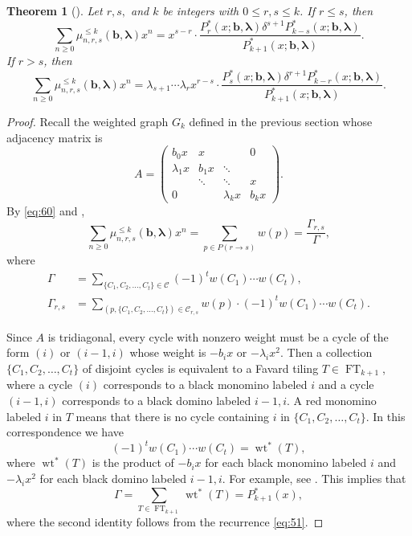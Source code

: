 \documentclass[oneside]{book}
\numberwithin{equation}{section}
\newtheorem{thm}{Theorem}[section]
\theoremstyle{definition}
\newcommand\FT{\operatorname{FT}}
\newcommand\wt{\operatorname{wt}}
\renewcommand\vec[1]{\bm{#1}}
\newcommand\vb{\vec{b}}
\newcommand\vla{\vec{\lambda}}
\begin{document}
\begin{thm}[]
Let \( r,s, \) and \( k \) be integers with \( 0\le r,s\le k \).
If \(r\le s\), then 
\[
  \sum_{n\ge0} \mu_{n,r,s}^{\le k}(\vb,\vla) x^n = x^{s-r} \cdot
  \frac{P^*_r(x;\vb,\vla) \delta^{s+1}
    P^*_{k-s}(x;\vb,\vla)}{P^*_{k+1}(x;\vb,\vla)}.
\]
  If \(r> s\), then
  \[
    \sum_{n\ge0} \mu_{n,r,s}^{\le k}(\vb,\vla) x^n = \lambda_{s+1}
    \cdots \lambda_r x^{r-s} \cdot \frac{ P^*_s(x;\vb,\vla) \delta^{r+1}
      P^*_{k-r}(x;\vb,\vla)}{P^*_{k+1}(x;\vb,\vla)} .
  \]
\end{thm}

\begin{proof}
Recall the
weighted graph \( G_k \) defined in the previous section whose
adjacency matrix is
 \[
  A = 
  \begin{pmatrix}
    b_0x & x &  & 0 \\
    \lambda_1x & b_1x & \ddots & \\
             & \ddots & \ddots & x \\
   0  &  & \lambda_{k}x & b_{k}x
  \end{pmatrix}.
\] 
By \eqref{eq:60} and ,
\begin{equation}\label{eq:64}
  \sum_{n\ge0} \mu_{n,r,s}^{\le k}(\vb,\vla) x^n
  = \sum_{p\in P(r\to s)}  w(p) =\frac{\Gamma_{r,s}}{\Gamma},
\end{equation}
where
\begin{align*}
  \Gamma
  &= \sum_{\{C_1, C_2,\dots,C_t\}\in \mathcal{C}} (-1)^{t} w(C_1) \cdots w(C_t),\\
  \Gamma_{r,s} &= \sum_{(p,\{C_1, C_2,\dots,C_t\})\in \mathcal{C}_{r,s}} w(p) \cdot (-1)^{t} w(C_1) \cdots w(C_t).
\end{align*}

Since \( A \) is tridiagonal, every cycle with nonzero weight must be
a cycle of the form \( (i) \) or \( (i-1,i) \) whose weight is
\( -b_ix \) or \( -\lambda_ix^2 \). Then a collection
\( \{C_1, C_2,\dots,C_t\} \) of disjoint cycles is equivalent to a
Favard tiling \( T\in \FT_{k+1} \), where a cycle \( (i) \)
corresponds to a black monomino labeled \( i \) and a cycle
\( (i-1,i) \) corresponds to a black domino labeled \( i-1,i \). A red
monomino labeled \( i \) in \( T \) means that there is no cycle
containing \( i \) in \( \{C_1, C_2,\dots,C_t\} \). In this
correspondence we have
\[
  (-1)^{t} w(C_1) \cdots w(C_t) = \wt^*(T),
\]
where \( \wt^*(T) \) is the product of \( -b_ix \) for each black
monomino labeled \( i \) and \( -\lambda_ix^2 \) for each black domino
labeled \( i-1,i \). For example, see . This implies that
\begin{equation}\label{eq:62}
  \Gamma = \sum_{T\in \FT_{k+1}} \wt^*(T) = P^*_{k+1}(x),
\end{equation}
where the second identity follows from the recurrence \eqref{eq:51}.


\end{proof}
\end{document}
